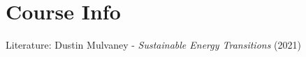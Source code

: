\section{Course Info}

Literature: Dustin Mulvaney - \textit{Sustainable Energy Transitions} (2021)
